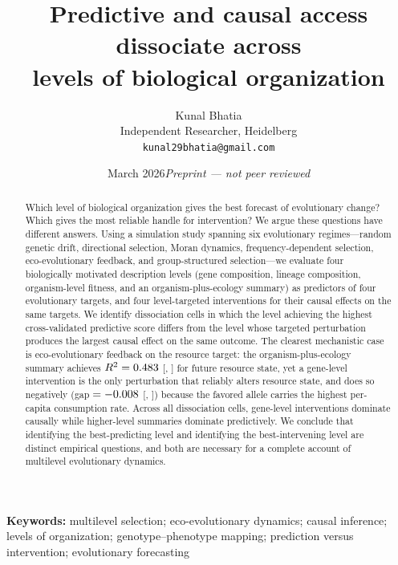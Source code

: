 \documentclass[11pt,a4paper]{article}
\title{Predictive and causal access dissociate across\\
       levels of biological organization}
\author{Kunal Bhatia\\
\small Independent Researcher, Heidelberg\\
\small \texttt{kunal29bhatia@gmail.com}}
\date{March 2026\quad\textit{Preprint --- not peer reviewed}}
\begin{document}
\maketitle
\vspace{-6pt}

\begin{abstract}
\noindent
Which level of biological organization gives the best forecast of evolutionary
change?
Which gives the most reliable handle for intervention?
We argue these questions have different answers.
Using a simulation study spanning six evolutionary regimes---random genetic drift,
directional selection, Moran dynamics, frequency-dependent selection,
eco-evolutionary feedback, and group-structured selection---we evaluate four
biologically motivated description levels (gene composition, lineage composition,
organism-level fitness, and an organism-plus-ecology summary) as predictors
of four evolutionary targets, and four level-targeted interventions for
their causal effects on the same targets.
We identify \NcellsDiss{} dissociation cells in which the level achieving the
highest cross-validated predictive score differs from the level whose targeted
perturbation produces the largest causal effect on the same outcome.
The clearest mechanistic case is eco-evolutionary feedback on the resource target:
the organism-plus-ecology summary achieves $R^2 = 0.483{}$
[\FlagPredLo{}, \FlagPredHi{}] for future resource state, yet a gene-level
intervention is the only perturbation that reliably alters resource state,
and does so negatively (gap $= -0.008{}$ [\FlagCausLo{}, \FlagCausHi{}])
because the favored allele carries the highest per-capita consumption rate.
Across all \NcellsDiss{} dissociation cells, gene-level interventions dominate
causally while higher-level summaries dominate predictively.
We conclude that identifying the best-predicting level and identifying the
best-intervening level are distinct empirical questions, and both are necessary
for a complete account of multilevel evolutionary dynamics.
\end{abstract}

\bigskip
\noindent\textbf{Keywords:}\enspace
multilevel selection; eco-evolutionary dynamics; causal inference; levels of organization;
genotype--phenotype mapping; prediction versus intervention; evolutionary forecasting

\clearpage

\end{document}
